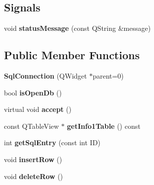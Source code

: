 \subsection*{Signals}
\begin{DoxyCompactItemize}
\item 
\hypertarget{classSqlConnection_add3790e6a432367e0df8774d952a74da}{void {\bfseries status\-Message} (const Q\-String \&message)}\label{classSqlConnection_add3790e6a432367e0df8774d952a74da}

\end{DoxyCompactItemize}
\subsection*{Public Member Functions}
\begin{DoxyCompactItemize}
\item 
\hypertarget{classSqlConnection_ad936fc98369d3e3f0471aee180d8a80a}{{\bfseries Sql\-Connection} (Q\-Widget $\ast$parent=0)}\label{classSqlConnection_ad936fc98369d3e3f0471aee180d8a80a}

\item 
\hypertarget{classSqlConnection_a2f0318c01899357ce4a3092e2993f6d3}{bool {\bfseries is\-Open\-Db} ()}\label{classSqlConnection_a2f0318c01899357ce4a3092e2993f6d3}

\item 
\hypertarget{classSqlConnection_aa03f1185085e3f8607bcf1f607a60a22}{virtual void {\bfseries accept} ()}\label{classSqlConnection_aa03f1185085e3f8607bcf1f607a60a22}

\item 
\hypertarget{classSqlConnection_a9279e66a9187e4fc47b00b8883085352}{const Q\-Table\-View $\ast$ {\bfseries get\-Info1\-Table} () const }\label{classSqlConnection_a9279e66a9187e4fc47b00b8883085352}

\item 
\hypertarget{classSqlConnection_ac12be705fcd20869aeca038b5de97136}{int {\bfseries get\-Sql\-Entry} (const int I\-D)}\label{classSqlConnection_ac12be705fcd20869aeca038b5de97136}

\item 
\hypertarget{classSqlConnection_a12cb9b234c9c46517015232d3e712203}{void {\bfseries insert\-Row} ()}\label{classSqlConnection_a12cb9b234c9c46517015232d3e712203}

\item 
\hypertarget{classSqlConnection_a2f7155fdf28187d4328c28b0ead736e7}{void {\bfseries delete\-Row} ()}\label{classSqlConnection_a2f7155fdf28187d4328c28b0ead736e7}


\end{DoxyCompactItemize}
